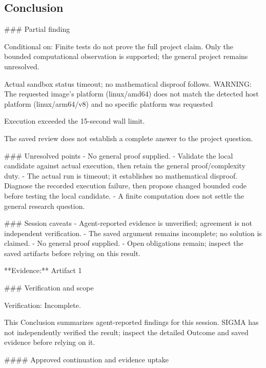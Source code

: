 \documentclass[11pt]{article}
\begin{document}
\subsection{Conclusion}
\#\#\# Partial finding

Conditional on: Finite tests do not prove the full project claim. Only the bounded computational observation is supported; the general project remains unresolved.

Actual sandbox status timeout; no mathematical disproof follows. WARNING: The requested image's platform (linux/amd64) does not match the detected host platform (linux/arm64/v8) and no specific platform was requested

Execution exceeded the 15-second wall limit.

The saved review does not establish a complete answer to the project question.

\#\#\# Unresolved points
- No general proof supplied.
- Validate the local candidate against actual execution, then retain the general proof/complexity duty.
- The actual run is timeout; it establishes no mathematical disproof. Diagnose the recorded execution failure, then propose changed bounded code before testing the local candidate.
- A finite computation does not settle the general research question.

\#\#\# Session caveats
- Agent-reported evidence is unverified; agreement is not independent verification.
- The saved argument remains incomplete; no solution is claimed.
- No general proof supplied.
- Open obligations remain; inspect the saved artifacts before relying on this result.

**Evidence:** Artifact 1

\#\#\# Verification and scope

Verification: Incomplete.

This Conclusion summarizes agent-reported findings for this session. SIGMA has not independently verified the result; inspect the detailed Outcome and saved evidence before relying on it.

\#\#\#\# Approved continuation and evidence uptake
\end{document}
